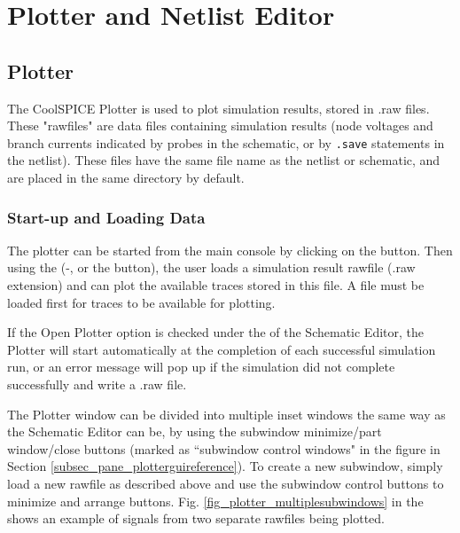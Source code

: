 \chapter{Plotter and Netlist Editor}

\label{chap_plotterandnetlisteditor_pane}

\section{Plotter}
\label{sec_pane_plotter}

The CoolSPICE Plotter is used to plot simulation results, stored in \textsf{.raw} files. These "rawfiles" are data files containing simulation results (node voltages and branch currents indicated by probes in the schematic, or by \texttt{.save} statements in the netlist).  These files have the same file name as the netlist or schematic, and are placed in the same directory by default.  

\subsection{Start-up and Loading Data}
\label{subsec_pane_startuploadingdata}

The plotter can be started from the main console by clicking on the  button.  Then using the  (-, or the  button), the user loads a simulation result rawfile (\textsf{.raw} extension) and can plot the available traces stored in this file.  A file must be loaded first for traces to be available for plotting.


If the \textsf{Open Plotter} option is checked under the  of the Schematic Editor, the Plotter will start automatically at the completion of each successful simulation run, or an error message will pop up if the simulation did not complete successfully and write a \textsf{.raw} file.

 The Plotter window can be divided into multiple inset windows the same way as the Schematic Editor can be, by using the subwindow minimize/part window/close buttons (marked as ``subwindow control windows" in the figure in Section \ref{subsec_pane_plotterguireference}).  To create a new subwindow, simply load a new rawfile as described above and use the subwindow control buttons to minimize and arrange buttons.  Fig. \ref{fig_plotter_multiplesubwindows} in the shows an example of signals from two separate rawfiles being plotted.


